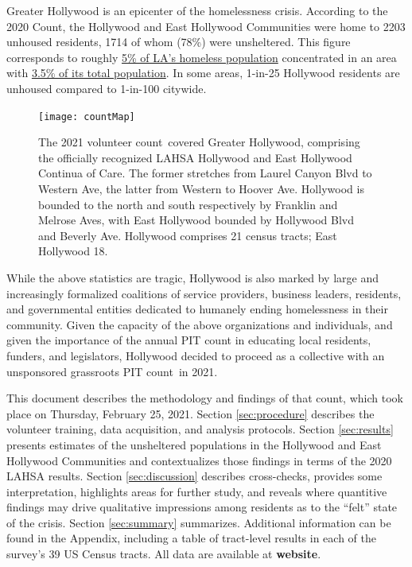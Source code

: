 \documentclass[11pt,twocolumn]{article}
\def\bfr{\bf\color{red}}
\def\Count{count}
\begin{document}
Greater Hollywood is an epicenter of the homelessness crisis. According to the 2020 Count, the 
Hollywood and East Hollywood Communities were home to 2203 unhoused residents, 1714 of whom 
(78\%) were unsheltered. This figure corresponds to roughly 
\href{https://www.lahsa.org/data?id=45-2020-homeless-count-by-community-city}
{5\% of LA's homeless population} concentrated in an area with 
\href{https://geomap.ffiec.gov/FFIECGeocMap/GeocodeMap1.aspx}{3.5\% of its total population}. 
In some areas, 1-in-25 Hollywood residents are unhoused compared to 1-in-100 citywide.

\begin{figure}
	\centering
	\texttt{[image: countMap]}
	\caption{The 2021 volunteer \Count\ covered Greater Hollywood, comprising the 
			officially recognized LAHSA Hollywood and East Hollywood Continua
			of Care. The former stretches from Laurel Canyon Blvd to Western Ave,
			the latter from Western to Hoover Ave. Hollywood is bounded to the north
			and south respectively by Franklin	and Melrose Aves, with East Hollywood
			bounded by Hollywood Blvd and Beverly Ave. Hollywood comprises
			21 census tracts; East Hollywood 18.}
	\label{fig:map}	
\end{figure}

While the above statistics are tragic, Hollywood is also marked by large and increasingly formalized
coalitions of service providers, business leaders, residents, and governmental entities dedicated to 
humanely ending homelessness in their community. Given the capacity of the above organizations and 
individuals, and given the importance of the annual PIT count in educating local residents, funders, and
legislators, Hollywood decided to proceed as a collective with an unsponsored grassroots PIT \Count\
in 2021.

This document describes the methodology and findings of that \Count, which took place on Thursday, 
February 25, 2021. Section \ref{sec:procedure} describes the volunteer training, data acquisition, 
and analysis protocols. Section \ref{sec:results} presents estimates of the unsheltered 
populations in the Hollywood and East Hollywood Communities and contextualizes those findings in 
terms of the 2020 LAHSA results. Section \ref{sec:discussion} describes cross-checks, provides some 
interpretation, highlights areas for further study, and reveals where quantitive findings may drive 
qualitative impressions among residents as to the ``felt'' state of the crisis. Section \ref{sec:summary} 
summarizes. Additional information can be found in the Appendix, including a table of tract-level 
results in each of the survey's 39 US Census tracts. All data are available at {\bfr website}.
\end{document}
